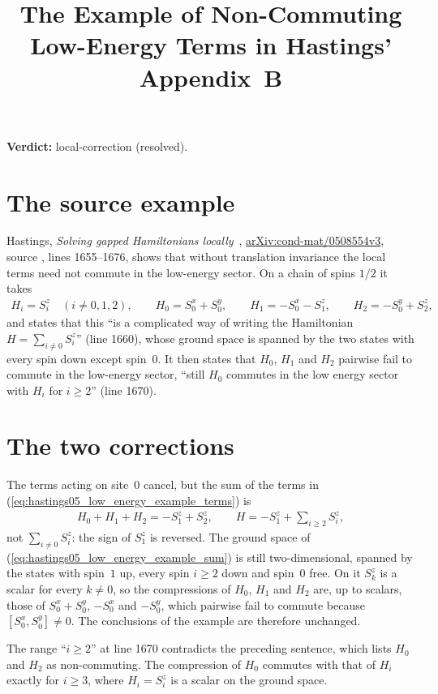 \documentclass{article}
\title{The Example of Non-Commuting Low-Energy Terms in Hastings' Appendix~B}
\author{}
\date{}
\providecommand{\gapnote}[2]{\par\noindent\textbf{Verdict:} #1 (#2).\par}
\begin{document}
\maketitle
\gapnote{local-correction}{resolved}

\section{The source example}
Hastings, \emph{Solving gapped Hamiltonians locally}~\cite{Hastings2006Solving},
\href{https://arxiv.org/abs/cond-mat/0508554v3}{arXiv:cond-mat/0508554v3},
source , lines 1655--1676, shows that without translation
invariance the local terms need not commute in the low-energy sector. On a
chain of spins $1/2$ it takes
\begin{align}
    H_i=S^z_i\quad(i\neq0,1,2),\qquad
    H_0=S^x_0+S^y_0,\qquad
    H_1=-S^x_0-S^z_1,\qquad
    H_2=-S^y_0+S^z_2,
    \label{eq:hastings05_low_energy_example_terms}
\end{align}
and states that this ``is a complicated way of writing the Hamiltonian
$H=\sum_{i\neq0}S^z_i$'' (line 1660), whose ground space is spanned by the two
states with every spin down except spin~$0$. It then states that $H_0$, $H_1$
and $H_2$ pairwise fail to commute in the low-energy sector, ``still $H_0$
commutes in the low energy sector with $H_i$ for $i\geq2$'' (line 1670).

\section{The two corrections}
The terms acting on site~$0$ cancel, but the sum of the terms in
(\ref{eq:hastings05_low_energy_example_terms}) is
\begin{align}
    H_0+H_1+H_2=-S^z_1+S^z_2,
    \qquad
    H=-S^z_1+\sum_{i\geq2}S^z_i,
    \label{eq:hastings05_low_energy_example_sum}
\end{align}
not $\sum_{i\neq0}S^z_i$: the sign of $S^z_1$ is reversed. The ground space of
(\ref{eq:hastings05_low_energy_example_sum}) is still two-dimensional,
spanned by the states with spin~$1$ up, every spin $i\geq2$ down and spin~$0$
free. On it $S^z_k$ is a scalar for every $k\neq0$, so the compressions of
$H_0$, $H_1$ and $H_2$ are, up to scalars, those of $S^x_0+S^y_0$, $-S^x_0$ and
$-S^y_0$, which pairwise fail to commute because $[S^x_0,S^y_0]\neq0$. The
conclusions of the example are therefore unchanged.

The range ``$i\geq2$'' at line 1670 contradicts the preceding sentence, which
lists $H_0$ and $H_2$ as non-commuting. The compression of $H_0$ commutes with
that of $H_i$ exactly for $i\geq3$, where $H_i=S^z_i$ is a scalar on the ground
space.
\end{document}
